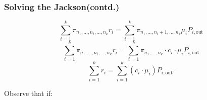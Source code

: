 \documentclass[10pt,notes]{beamer}
\begin{document}
\begin{frame}
    \frametitle{Solving the Jackson(contd.)}
    \begin{center} 
        \[
        \sum_{i=1}^{k} \pi_{n_1,\ldots,n_i,\ldots,n_k} r_i = \sum_{i=1}^{k} \pi_{n_1,\ldots,n_i+1,\ldots,n_k} \mu_i P_{i,\text{out}}
        \]
        \[
        \sum_{i=1}^{k} \pi_{n_1,\ldots,n_i,\ldots,n_k} r_i = \sum_{i=1}^{k} \pi_{n_1,\ldots,n_k} \cdot c_i \cdot \mu_i P_{i,\text{out}}
        \]
        \[
        \sum_{i=1}^{k} r_i = \sum_{i=1}^{k} (c_i \cdot \mu_i) P_{i,\text{out}}.
        \]
    \end{center}
    Observe that if:
    \begin{center} 

    \end{center}
    
\end{frame}
\end{document}
